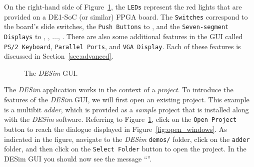On the right-hand side of Figure~\ref{fig:gui}, the \texttt{LEDs} represent the 
red lights  that are provided on a DE1-SoC (or similar)
FPGA board.  The \texttt{Switches} correspond to the board's  
slide switches, the \texttt{Push Buttons} to , and the 
\texttt{Seven-segment Displays} to , , $\ldots$, .
There are also some additional features in the GUI called \texttt{PS/2 Keyboard}, 
\texttt{Parallel Ports}, and \texttt{VGA Display}. Each of these features is discussed 
in Section~\ref{sec:advanced}.

\begin{figure}[H]
	\begin{center}
        \setlength{\fboxsep}{0pt}
	\end{center}
		  \caption{The {\it DESim} GUI.}
	\label{fig:gui}
\end{figure}

The {\it DESim} application works in the context of a {\it project}. To introduce the features of 
the {\it DESim} GUI, we will first open an existing project. This example is a multibit 
{\it adder}, which is provided as a {\it sample} project that is installed along with the 
{\it DESim} software. Referring to Figure~\ref{fig:gui}, click on the \texttt{Open Project} button 
to reach the dialogue displayed in Figure~\ref{fig:open_windows}. As indicated in the figure, 
navigate to the {\it DESim} \texttt{demos/\demos} folder, click on the \texttt{adder} folder, and
then click on the \texttt{Select Folder} button to open the project. In the DESim GUI you
should now see the message ``''.

